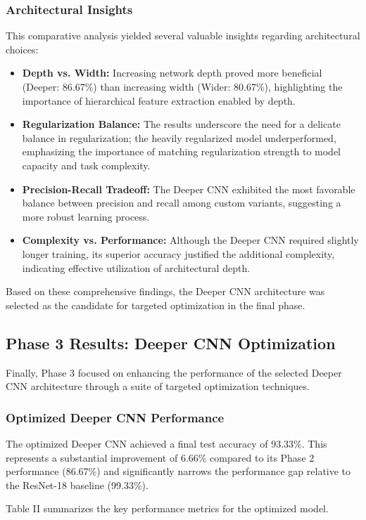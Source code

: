\subsubsection{Architectural Insights}
This comparative analysis yielded several valuable insights regarding architectural choices:
\begin{itemize}
    \item \textbf{Depth vs. Width:} Increasing network depth proved more beneficial (Deeper: 86.67\%) than increasing width (Wider: 80.67\%), highlighting the importance of hierarchical feature extraction enabled by depth.
    \item \textbf{Regularization Balance:} The results underscore the need for a delicate balance in regularization; the heavily regularized model underperformed, emphasizing the importance of matching regularization strength to model capacity and task complexity.
    \item \textbf{Precision-Recall Tradeoff:} The Deeper CNN exhibited the most favorable balance between precision and recall among custom variants, suggesting a more robust learning process.
    \item \textbf{Complexity vs. Performance:} Although the Deeper CNN required slightly longer training, its superior accuracy justified the additional complexity, indicating effective utilization of architectural depth.
\end{itemize}
Based on these comprehensive findings, the Deeper CNN architecture was selected as the candidate for targeted optimization in the final phase.

\subsection{Phase 3 Results: Deeper CNN Optimization}
Finally, Phase 3 focused on enhancing the performance of the selected Deeper CNN architecture through a suite of targeted optimization techniques.

\subsubsection{Optimized Deeper CNN Performance}
The optimized Deeper CNN achieved a final test accuracy of 93.33\%. This represents a substantial improvement of 6.66\% compared to its Phase 2 performance (86.67\%) and significantly narrows the performance gap relative to the ResNet-18 baseline (99.33\%).

Table II summarizes the key performance metrics for the optimized model.

